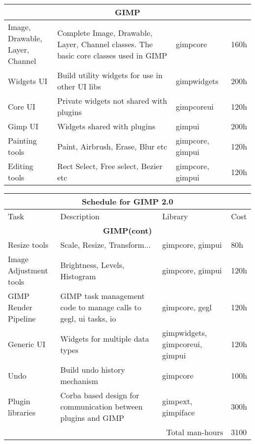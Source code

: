 \begin{flushleft}
\begin{tabular}{|p{2cm}|p{5cm}|p{2cm}|l|}
\multicolumn{4}{|c|}{\bf GIMP}\\
\hline 
\raggedright{Image, Drawable,\\ Layer, Channel} & Complete Image, Drawable, Layer, Channel classes. The basic core classes used in GIMP & gimpcore & 160h\\
\hline 
Widgets UI & Build utility widgets for use in other UI libs  & gimpwidgets & 200h\\
\hline
Core UI & Private widgets not shared with plugins & gimpcoreui & 120h\\
\hline
Gimp UI & Widgets shared with plugins & gimpui & 200h\\
\hline 
Painting tools & Paint, Airbrush, Erase, Blur etc & gimpcore, gimpui & 120h \\
\hline 
\raggedright{Editing \\tools} & Rect Select, Free select, Bezier etc & gimpcore, gimpui & 120h \\
\hline 
\end{tabular}

\begin{tabular}{|p{2cm}|p{5cm}|p{2cm}|l|}\hline
\multicolumn{4}{|c|}{\rule[-3mm]{0mm}{8mm} \large \bf Schedule for GIMP 2.0}\\  
\hline
Task & Description & Library & Cost\\ 
\hline 
\multicolumn{4}{|c|}{\bf GIMP(cont)}\\
\hline 
Resize tools & Scale, Resize, Transform... & gimpcore, gimpui & 80h \\
\hline 
\raggedright{Image\\ Adjustment tools} & Brightness, Levels, Histogram & gimpcore, gimpui & 120h\\
\hline
\raggedright{GIMP\\ Render Pipeline} & GIMP task management code to manage calls to gegl, ui tasks, io & gimpcore, gegl & 120h \\
\hline 
Generic UI & Widgets for multiple data types & gimpwidgets, gimpcoreui, gimpui & 120h\\
\hline
Undo & Build undo history mechanism & gimpcore & 100h\\
\hline
\raggedright{Plugin\\libraries} & Corba based design for communication between plugins and GIMP & gimpext, gimpiface & 300h\\
\hline

\multicolumn{3}{|r|}{Total man-hours} & 3100\\
\hline
\end{tabular}
\end{flushleft}

	
